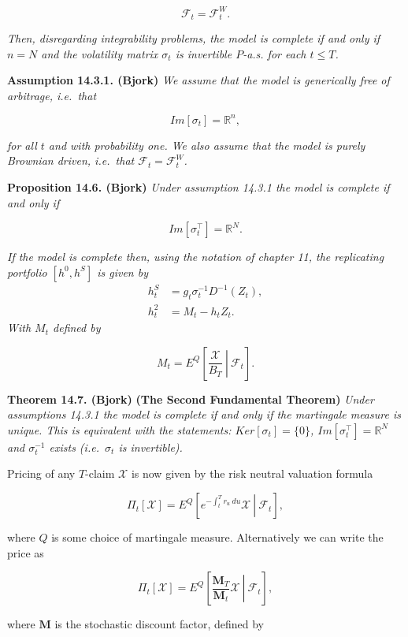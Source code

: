 \documentclass[
]{book}
\begin{document}
\[
\mathcal{F}_t=\mathcal{F}^W_t.\tag{14.14}
\]

\emph{Then, disregarding integrability problems, the model is complete if and only if \(n=N\) and the volatility matrix \(\sigma_t\) is invertible \(P\)-a.s. for each \(t\le T\).}

\textbf{Assumption 14.3.1. (Bjork)} \emph{We assume that the model is generically free of arbitrage, i.e.~that}

\[
Im[\sigma_t]=\mathbb{R}^n,\tag{14.16}
\]

\emph{for all \(t\) and with probability one. We also assume that the model is purely Brownian driven, i.e.~that \(\mathcal{F}_t=\mathcal{F}_t^W\).}

\textbf{Proposition 14.6. (Bjork)} \emph{Under assumption 14.3.1 the model is complete if and only if}

\[
Im[\sigma_t^\top]=\mathbb{R}^N.\tag{14.23}
\]

\emph{If the model is complete then, using the notation of chapter 11, the replicating portfolio \([h^0,h^S]\) is given by}
\begin{align*}
h_t^S&=g_t\sigma_t^{-1}D^{-1}(Z_t),\tag{14.24}\\
h_t^2&=M_t-h_tZ_t.\tag{14.25}
\end{align*}
\emph{With \(M_t\) defined by}

\[
M_t=E^Q\left[\left. \frac{\mathcal{X}}{B_T}\ \right\vert\ \mathcal{F}_t \right].\tag{14.17}
\]

\textbf{Theorem 14.7. (Bjork)} \textbf{(The Second Fundamental Theorem)} \emph{Under assumptions 14.3.1 the model is complete if and only if the martingale measure is unique. This is equivalent with the statements: \(Ker[\sigma_t]=\{0\}\), \(Im[\sigma_t^\top]=\mathbb{R}^N\) and \(\sigma_t^{-1}\) exists (i.e.~\(\sigma_t\) is invertible).}

Pricing of any \(T\)-claim \(\mathcal{X}\) is now given by the risk neutral valuation formula

\[
\Pi_t[\mathcal{X}] = E^Q\left[\left. e^{-\int_t^Tr_u\ du}\mathcal{X} \ \right\vert\ \mathcal{F}_t\right],\tag{14.27}
\]

where \(Q\) is some choice of martingale measure. Alternatively we can write the price as

\[
\Pi_t[\mathcal{X}] = E^Q\left[\left. \frac{\mathbf{M}_T}{\mathbf{M}_t}\mathcal{X} \ \right\vert\ \mathcal{F}_t\right],\tag{14.29}
\]

where \(\mathbf{M}\) is the stochastic discount factor, defined by
\end{document}
